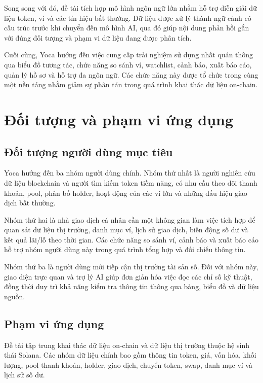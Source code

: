 Song song với đó, đề tài tích hợp mô hình ngôn ngữ lớn nhằm hỗ trợ diễn giải dữ liệu token, ví và các tín hiệu bất thường. Dữ liệu được xử lý thành ngữ cảnh có cấu trúc trước khi chuyển đến mô hình AI, qua đó giúp nội dung phản hồi gắn với đúng đối tượng và phạm vi dữ liệu đang được phân tích.

Cuối cùng, Yoca hướng đến việc cung cấp trải nghiệm sử dụng nhất quán thông qua biểu đồ tương tác, chức năng so sánh ví, watchlist, cảnh báo, xuất báo cáo, quản lý hồ sơ và hỗ trợ đa ngôn ngữ. Các chức năng này được tổ chức trong cùng một nền tảng nhằm giảm sự phân tán trong quá trình khai thác dữ liệu on-chain.

\section{Đối tượng và phạm vi ứng dụng}
\label{sec:doi_tuong_pham_vi}

\subsection{Đối tượng người dùng mục tiêu}

Yoca hướng đến ba nhóm người dùng chính. Nhóm thứ nhất là người nghiên cứu dữ liệu blockchain và người tìm kiếm token tiềm năng, có nhu cầu theo dõi thanh khoản, pool, phân bố holder, hoạt động của các ví lớn và những dấu hiệu giao dịch bất thường.

Nhóm thứ hai là nhà giao dịch cá nhân cần một không gian làm việc tích hợp để quan sát dữ liệu thị trường, danh mục ví, lịch sử giao dịch, biến động số dư và kết quả lãi/lỗ theo thời gian. Các chức năng so sánh ví, cảnh báo và xuất báo cáo hỗ trợ nhóm người dùng này trong quá trình tổng hợp và đối chiếu thông tin.

Nhóm thứ ba là người dùng mới tiếp cận thị trường tài sản số. Đối với nhóm này, giao diện trực quan và trợ lý AI giúp đơn giản hóa việc đọc các chỉ số kỹ thuật, đồng thời duy trì khả năng kiểm tra thông tin thông qua bảng, biểu đồ và dữ liệu nguồn.

\subsection{Phạm vi ứng dụng}

Đề tài tập trung khai thác dữ liệu on-chain và dữ liệu thị trường thuộc hệ sinh thái Solana. Các nhóm dữ liệu chính bao gồm thông tin token, giá, vốn hóa, khối lượng, pool thanh khoản, holder, giao dịch, chuyển token, swap, danh mục ví và lịch sử số dư.

